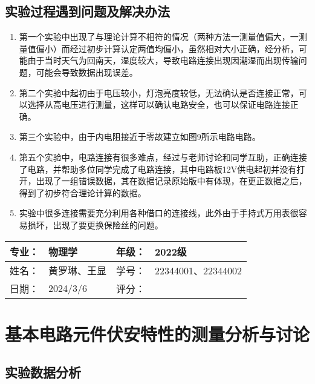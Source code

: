 \documentclass[dvipsnames, svgnames,a4paper,11pt]{article}
\begin{document}

	
	\subsection{实验过程遇到问题及解决办法}
	\begin{enumerate}
		\item 第一个实验中出现了与理论计算不相符的情况（两种方法一测量值偏大，一测量值偏小）而经过初步计算认定两值均偏小，虽然相对大小正确，经分析，可能由于当时天气为回南天，湿度较大，导致电路连接出现因潮湿而出现传输问题，可能会导致数据出现误差。
		\item 第二个实验中起初由于电压较小，灯泡亮度较低，无法确认是否连接正常，可以选择从高电压进行测量，这样可以确认电路安全，也可以保证电路连接正确。
		\item 第三个实验中，由于内电阻接近于零故建立如图9所示电路电路。
		\item 第五个实验中，电路连接有很多难点，经过与老师讨论和同学互助，正确连接了电路，并帮助多位同学完成了电路连接，其中电路板12V供电起初并没有打开，出现了一组错误数据，其在数据记录原始版中有体现，在更正数据之后，得到了初步符合理论计算的数据。
		\item 实验中很多连接需要充分利用各种借口的连接线，此外由于手持式万用表很容易损坏，出现了要更换保险丝的问题。
	\end{enumerate}
	
	
	
	\clearpage
	
	\begin{table}
		\renewcommand\arraystretch{1.7}
		\begin{tabularx}{\textwidth}{|X|X|X|X|}
			\hline
			专业：& 物理学 &年级：& 2022级\\
			\hline
			姓名： & 黄罗琳、王显 & 学号：& 22344001、22344002\\
			\hline
			日期：& 2024/3/6 & 评分： &\\
			\hline
		\end{tabularx}
	\end{table}
	
	\section{基本电路元件伏安特性的测量\quad\heiti 分析与讨论}
	
	\subsection{实验数据分析}
	
\end{document}
